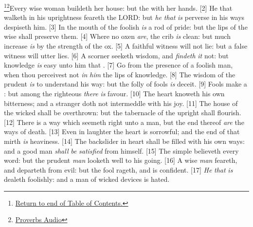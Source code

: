 \footnote{\textcolor[cmyk]{0.99998,1,0,0}{\hyperlink{TOC}{Return to end of Table of Contents.}}}\footnote{\href{https://audiobible.com/bible/proverbs_14.html}{\textcolor[cmyk]{0.99998,1,0,0}{Proverbs Audio}}}\textcolor[cmyk]{0.99998,1,0,0}{Every wise woman buildeth her house: but the  with her hands.}
[2] \textcolor[cmyk]{0.99998,1,0,0}{He that walketh in his uprightness feareth the LORD: but \emph{he} \emph{that} \emph{is} perverse in his ways despiseth him.}
[3] \textcolor[cmyk]{0.99998,1,0,0}{In the mouth of the foolish \emph{is} a rod of pride: but the lips of the wise shall preserve them.}
[4] \textcolor[cmyk]{0.99998,1,0,0}{Where no oxen \emph{are}, the crib \emph{is} clean: but much increase \emph{is} by the strength of the ox.}
[5] \textcolor[cmyk]{0.99998,1,0,0}{A faithful witness will not lie: but a false witness will utter lies.}
[6] \textcolor[cmyk]{0.99998,1,0,0}{A scorner seeketh wisdom, and \emph{findeth} \emph{it} not: but knowledge \emph{is} easy unto him that .}
[7] \textcolor[cmyk]{0.99998,1,0,0}{Go from the presence of a foolish man, when thou perceivest not \emph{in} \emph{him} the lips of knowledge.}
[8] \textcolor[cmyk]{0.99998,1,0,0}{The wisdom of the prudent \emph{is} to understand his way: but the folly of fools \emph{is} deceit.}
[9] \textcolor[cmyk]{0.99998,1,0,0}{Fools make a : but among the righteous \emph{there} \emph{is} favour.}
[10] \textcolor[cmyk]{0.99998,1,0,0}{The heart knoweth his own bitterness; and a stranger doth not intermeddle with his joy.}
[11] \textcolor[cmyk]{0.99998,1,0,0}{The house of the wicked shall be overthrown: but the tabernacle of the upright shall flourish.}
[12] \textcolor[cmyk]{0.99998,1,0,0}{There is a way which seemeth right unto a man, but the end thereof \emph{are} the ways of death.}
[13] \textcolor[cmyk]{0.99998,1,0,0}{Even in laughter the heart is sorrowful; and the end of that mirth \emph{is} heaviness.}
[14] \textcolor[cmyk]{0.99998,1,0,0}{The backslider in heart shall be filled with his own ways: and a good man \emph{shall} \emph{be} \emph{satisfied} from himself.}
[15] \textcolor[cmyk]{0.99998,1,0,0}{The simple believeth every word: but the prudent \emph{man} looketh well to his going.}
[16] \textcolor[cmyk]{0.99998,1,0,0}{A wise \emph{man} feareth, and departeth from evil: but the fool rageth, and is confident.}
[17] \textcolor[cmyk]{0.99998,1,0,0}{\emph{He} \emph{that} \emph{is}  dealeth foolishly: and a man of wicked devices is hated.}
